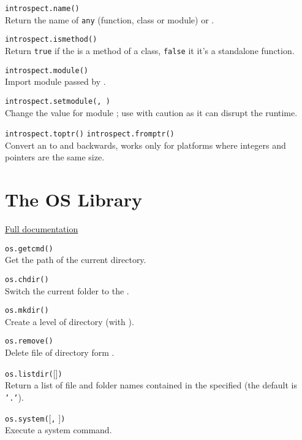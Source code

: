 \hangpar \texttt{introspect.name(}\texttt{)} \\
Return the name of \texttt{any} (function, class or module) or .

\hangpar \texttt{introspect.ismethod(}\texttt{)} \\
Return \texttt{true} if the  is a method of a class, \texttt{false} it it's a standalone function.

\hangpar \texttt{introspect.module(}\texttt{)} \\
Import module passed by .

\hangpar \texttt{introspect.setmodule(}\texttt{, }\texttt{)} \\
Change the value for module ; use with caution as it can disrupt the runtime.

\hangpar \texttt{introspect.toptr(}\texttt{)}  \texttt{introspect.fromptr(}\texttt{)} \\
Convert an  to  and backwards, works only for platforms where integers and pointers are the same size.

\section*{The OS Library}

\hangpar \href{https://github.com/berry-lang/berry/wiki/Chapter-7\#module-os}{Full documentation}

\hangpar \texttt{os.getcmd()} \\
Get the path of the current directory.

\hangpar \texttt{os.chdir(}\texttt{)} \\
Switch the current folder to the .

\hangpar \texttt{os.mkdir(}\texttt{)} \\
Create a level of directory (with ).

\hangpar \texttt{os.remove(}\texttt{)} \\
Delete file of directory form .

\hangpar \texttt{os.listdir(}[]\texttt{)} \\
Return a list of file and folder names contained in the specified  (the default is \texttt{'.'}).

\hangpar \texttt{os.system(}[\texttt{,} ]\texttt{)} \\
Execute a system command.

